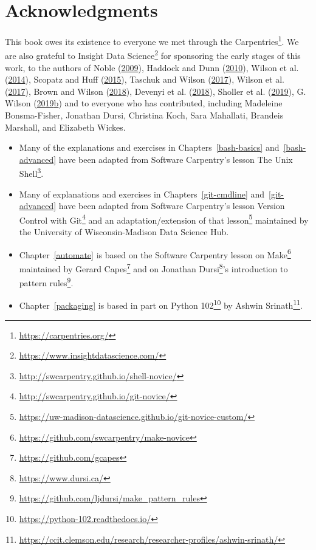 \documentclass[
]{krantz}
\renewcommand{\href}[2]{#2\footnote{\url{#1}}}
\begin{document}
\hypertarget{intro-ack}{%
\section{Acknowledgments}\label{intro-ack}}

This book owes its existence to
everyone we met through \href{https://carpentries.org/}{the Carpentries}.
We are also grateful to \href{https://www.insightdatascience.com/}{Insight Data Science} for sponsoring the early stages of this work,
to the authors of Noble (\protect\hyperlink{ref-Nobl2009}{2009}), Haddock and Dunn (\protect\hyperlink{ref-Hadd2010}{2010}), Wilson et al. (\protect\hyperlink{ref-Wils2014}{2014}), Scopatz and Huff (\protect\hyperlink{ref-Scop2015}{2015}), Taschuk and Wilson (\protect\hyperlink{ref-Tasc2017}{2017}), Wilson et al. (\protect\hyperlink{ref-Wils2017}{2017}), Brown and Wilson (\protect\hyperlink{ref-Brow2018}{2018}), Devenyi et al. (\protect\hyperlink{ref-Deve2018}{2018}), Sholler et al. (\protect\hyperlink{ref-Shol2019}{2019}), G. Wilson (\protect\hyperlink{ref-Wils2019}{2019}\protect\hyperlink{ref-Wils2019}{b})
and to everyone who has contributed, including Madeleine Bonsma-Fisher,
Jonathan Dursi,
Christina Koch,
Sara Mahallati,
Brandeis Marshall,
and Elizabeth Wickes.

\begin{itemize}
\item
  Many of the explanations and exercises in Chapters~\ref{bash-basics} and~\ref{bash-advanced}
  have been adapted from Software Carpentry's lesson
  \href{http://swcarpentry.github.io/shell-novice/}{The Unix Shell}.
\item
  Many of explanations and exercises in Chapters~\ref{git-cmdline} and~\ref{git-advanced}
  have been adapted from Software Carpentry's lesson
  \href{http://swcarpentry.github.io/git-novice/}{Version Control with Git} and an
  \href{https://uw-madison-datascience.github.io/git-novice-custom/}{adaptation/extension of that lesson} maintained by
  the University of Wisconsin-Madison Data Science Hub.
\item
  Chapter~\ref{automate} is based on the \href{https://github.com/swcarpentry/make-novice}{Software Carpentry lesson on Make}
  maintained by \href{https://github.com/gcapes}{Gerard Capes}
  and on \href{https://www.dursi.ca/}{Jonathan Dursi}'s
  \href{https://github.com/ljdursi/make_pattern_rules}{introduction to pattern rules}.
\item
  Chapter~\ref{packaging} is based in part on \href{https://python-102.readthedocs.io/}{Python 102}
  by \href{https://ccit.clemson.edu/research/researcher-profiles/ashwin-srinath/}{Ashwin Srinath}.
\end{itemize}
\end{document}
